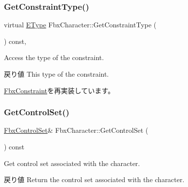\subsubsection{\texorpdfstring{Get\+Constraint\+Type()}{GetConstraintType()}}
{\footnotesize\ttfamily virtual \hyperlink{class_fbx_constraint_a49c1634663395eab7c28856df233ec66}{E\+Type} Fbx\+Character\+::\+Get\+Constraint\+Type (\begin{DoxyParamCaption}{ }\end{DoxyParamCaption}) const\hspace{0.3cm}{\ttfamily [protected]}, {\ttfamily [virtual]}}

Access the type of the constraint. \begin{DoxyReturn}{戻り値}
This type of the constraint. 
\end{DoxyReturn}


\hyperlink{class_fbx_constraint_adbeea66a1a605531a019aa6df90dc45b}{Fbx\+Constraint}を再実装しています。

\mbox{\label{class_fbx_character_a2810556535144497747222c7e36a2f4b}} 
\subsubsection{\texorpdfstring{Get\+Control\+Set()}{GetControlSet()}}
{\footnotesize\ttfamily \hyperlink{class_fbx_control_set}{Fbx\+Control\+Set}\& Fbx\+Character\+::\+Get\+Control\+Set (\begin{DoxyParamCaption}{ }\end{DoxyParamCaption}) const}

Get control set associated with the character. \begin{DoxyReturn}{戻り値}
Return the control set associated with the character. 
\end{DoxyReturn}
\mbox{\label{class_fbx_character_ad3a3779b2dfcb1fbb3b962441715e059}} 
